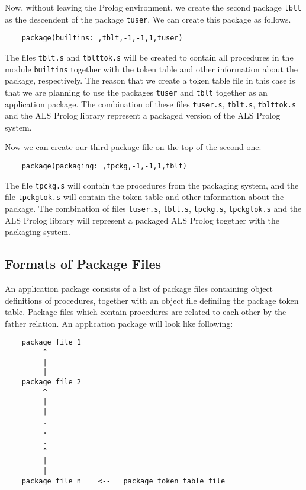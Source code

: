 Now, without leaving the Prolog environment, we create the second package
\verb|tblt| as the descendent of the package \verb|tuser|. We can create this package 
as follows.

\begin{verbatim}
    package(builtins:_,tblt,-1,-1,1,tuser)
\end{verbatim}

The files \verb|tblt.s| and \verb|tblttok.s| will be created to contain all procedures
in the module \verb|builtins| together with the token table and other information about
the package, respectively. The reason that we create a token table file in this case is 
that we are planning to use the packages \verb|tuser| and \verb|tblt| together as an application
package. The combination of these files \verb|tuser.s|, \verb|tblt.s|, \verb|tblttok.s|
and the ALS Prolog library represent a packaged version of the ALS Prolog system.

Now we can create our third package file on the top of the second one:

\begin{verbatim}
    package(packaging:_,tpckg,-1,-1,1,tblt)
\end{verbatim}

The file \verb|tpckg.s| will contain the procedures from the packaging
system, and the file \verb|tpckgtok.s| will contain the token table and
other information about the package. The combination of files \verb|tuser.s|,
\verb|tblt.s|, \verb|tpckg.s|, \verb|tpckgtok.s| and the ALS Prolog library will represent
a packaged ALS Prolog together with the packaging system.

\subsection{Formats of Package Files}

An application package consists of a list of package files containing object definitions of
procedures, together with an object file definiing the package token table.
Package files which contain procedures are related to each other 
by the father relation. An application package will look like following:

\begin{verbatim}
    package_file_1
         ^
         |
         |
    package_file_2
         ^
         |
         |
         .
         .
         .
         ^
         |
         |
    package_file_n    <--   package_token_table_file
\end{verbatim}

